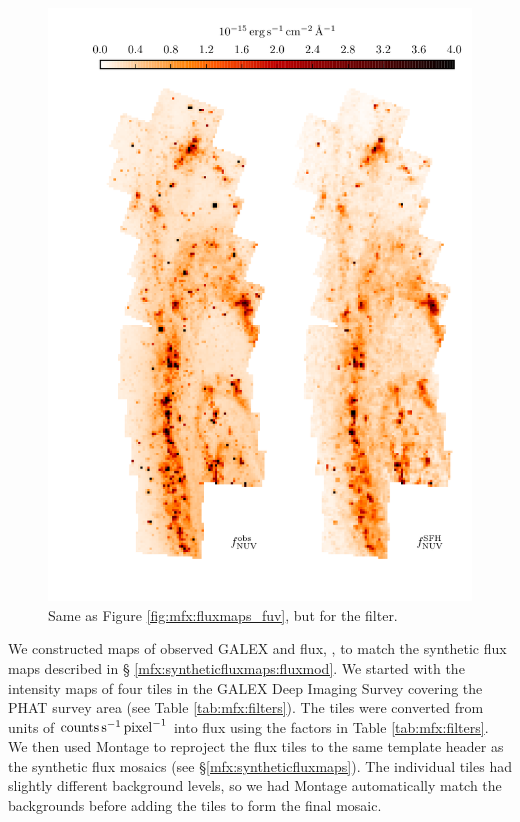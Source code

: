 \documentclass[iop, tighten]{emulateapj}
\begin{document}
\begin{figure}
\centering
\includegraphics[scale=0.9]{m31flux-figures/fluxmaps_nuv.pdf}
\caption[Observed and synthetic attenuated \nuv{} flux maps.]{Same as Figure
    \ref{fig:mfx:fluxmaps_fuv}, but for the \nuv{} filter.
}
\label{fig:mfx:fluxmaps_nuv}
\end{figure}


We constructed maps of observed GALEX \fuv{} and \nuv{} flux, \fxobs{}, to
match the synthetic flux maps described in \S
\ref{mfx:syntheticfluxmaps:fluxmod}. We started with the intensity maps of four
tiles in the GALEX Deep Imaging Survey \citep[DIS][]{Martin:2005} covering the
PHAT survey area (see Table \ref{tab:mfx:filters}). The tiles were converted
from units of $\mathrm{counts} \,\mathrm{s}^{-1} \,\mathrm{pixel}^{-1}$ into flux
using the factors in Table \ref{tab:mfx:filters}. We then used Montage to
reproject the flux tiles to the same template header as the synthetic flux
mosaics (see \S \ref{mfx:syntheticfluxmaps}). The individual tiles had slightly
different background levels, so we had Montage automatically match the
backgrounds before adding the tiles to form the final mosaic.
\end{document}
